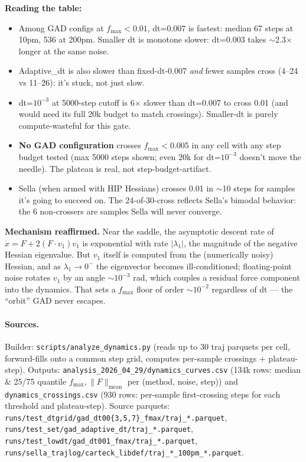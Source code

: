\documentclass[11pt]{article}
\begin{document}
\textbf{Reading the table:}
\begin{itemize}[leftmargin=1.5em]
\item Among GAD configs at $f_{\max}{<}0.01$, dt=0.007 is fastest:
  median 67 steps at 10pm, 536 at 200pm. Smaller dt is monotone slower:
  dt=0.003 takes $\sim$2.3$\times$ longer at the same noise.
\item Adaptive\_dt is also slower than fixed-dt-0.007 \emph{and} fewer
  samples cross (4--24 vs 11--26): it's stuck, not just slow.
\item dt=$10^{-3}$ at 5000-step cutoff is 6$\times$ slower than dt=0.007
  to cross 0.01 (and would need its full 20k budget to match crossings).
  Smaller-dt is purely compute-wasteful for this gate.
\item \textbf{No GAD configuration} crosses $f_{\max}{<}0.005$ in any cell
  with any step budget tested (max 5000 steps shown; even 20k for
  dt=$10^{-3}$ doesn't move the needle). The plateau is real, not
  step-budget-artifact.
\item Sella (when armed with HIP Hessians) crosses 0.01 in $\sim$10
  steps for samples it's going to succeed on. The 24-of-30-cross
  reflects Sella's bimodal behavior: the 6 non-crossers are samples
  Sella will never converge.
\end{itemize}

\textbf{Mechanism reaffirmed.} Near the saddle, the asymptotic descent
rate of $\dot x = F + 2(F\!\cdot\!v_1)v_1$ is exponential with rate
$|\lambda_1|$, the magnitude of the negative Hessian eigenvalue.
But $v_1$ itself is computed from the (numerically noisy) Hessian,
and as $\lambda_1{\to}0^-$ the eigenvector becomes ill-conditioned;
floating-point noise rotates $v_1$ by an angle $\sim 10^{-3}$ rad,
which couples a residual force component into the dynamics. That sets
a $f_{\max}$ floor of order $\sim 10^{-2}$ regardless of dt — the
``orbit'' GAD never escapes.

\paragraph{Sources.} Builder: \texttt{scripts/analyze\_dynamics.py}
(reads up to 30 traj parquets per cell, forward-fills onto a common
step grid, computes per-sample crossings + plateau-step). Outputs:
\texttt{analysis\_2026\_04\_29/dynamics\_curves.csv} (134k rows: median
\& 25/75 quantile $f_{\max}, \|F\|_{\text{mean}}$ per (method, noise,
step)) and \texttt{dynamics\_crossings.csv} (930 rows: per-sample
first-crossing steps for each threshold and plateau-step).
Source parquets:
\texttt{runs/test\_dtgrid/gad\_dt00\{3,5,7\}\_fmax/traj\_*.parquet},
\texttt{runs/test\_set/gad\_adaptive\_dt/traj\_*.parquet},
\texttt{runs/test\_lowdt/gad\_dt001\_fmax/traj\_*.parquet},
\texttt{runs/sella\_trajlog/carteck\_libdef/traj\_*\_100pm\_*.parquet}.
\end{document}
